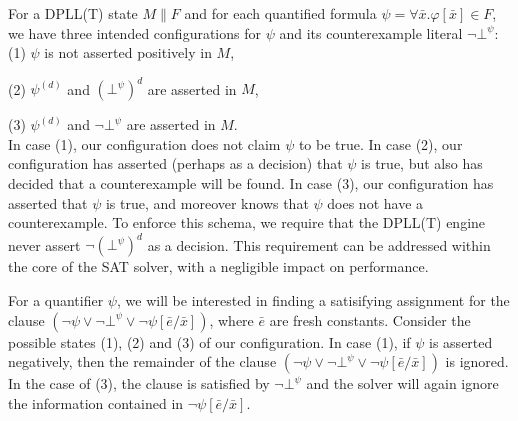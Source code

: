 \documentclass{llncs}
\begin{document}
For a DPLL(T) state $M \parallel F$ and for each quantified formula $\psi = \forall \bar{ x }. \varphi[ \bar{ x } ] \in F$, we have three intended configurations for $\psi$ and its counterexample literal $\neg \bot^\psi$: \\

(1) $\psi$ is not asserted positively in $M$, 

(2) $\psi^{(d)}$ and $(\bot^\psi)^d$ are asserted in $M$, 

(3) $\psi^{(d)}$ and $\neg \bot^\psi$ are asserted in $M$. \\

In case (1), our configuration does not claim $\psi$ to be true.
In case (2), our configuration has asserted (perhaps as a decision) that $\psi$ is true, but also has decided that a counterexample will be found.
In case (3), our configuration has asserted that $\psi$ is true, and moreover knows that $\psi$ does not have a counterexample.
To enforce this schema, we require that the DPLL(T) engine never assert $\neg (\bot^\psi)^d$ as a decision.
This requirement can be addressed within the core of the SAT solver, with a negligible impact on performance.


For a quantifier $\psi$, we will be interested in finding a satisifying assignment for the clause $( \neg \psi \vee \neg \bot^\psi \vee \neg \psi[\bar{e}/\bar{x}])$, where $\bar{e}$ are fresh constants.
Consider the possible states (1), (2) and (3) of our configuration.
In case (1), if $\psi$ is asserted negatively, then the remainder of the clause $( \neg \psi \vee \neg \bot^\psi \vee \neg \psi[\bar{e}/\bar{x}])$ is ignored.
In the case of (3), the clause is satisfied by $\neg \bot^\psi$ and the solver will again ignore the information contained in $\neg \psi[\bar{e}/\bar{x}]$.
\end{document}
